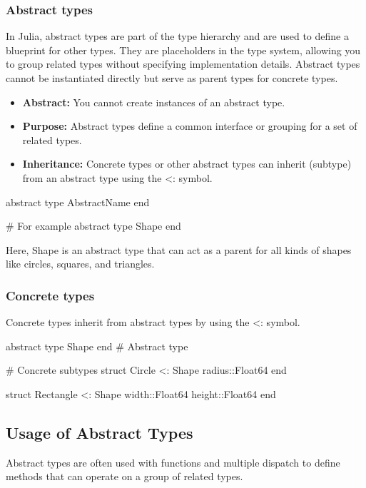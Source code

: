 \documentclass{report}
\begin{document}
     \subsubsection{Abstract types}
     \bigbreak \noindent 
     In Julia, abstract types are part of the type hierarchy and are used to define a blueprint for other types. They are placeholders in the type system, allowing you to group related types without specifying implementation details. Abstract types cannot be instantiated directly but serve as parent types for concrete types.
     \begin{itemize}
         \item \textbf{Abstract:} You cannot create instances of an abstract type.
         \item \textbf{Purpose:} Abstract types define a common interface or grouping for a set of related types.
         \item \textbf{Inheritance:} Concrete types or other abstract types can inherit (subtype) from an abstract type using the <: symbol.
     \end{itemize}
     \bigbreak \noindent 
     \begin{jlcode}
     abstract type AbstractName end

     # For example
     abstract type Shape end
     \end{jlcode}
     \bigbreak \noindent 
     Here, Shape is an abstract type that can act as a parent for all kinds of shapes like circles, squares, and triangles.

     \bigbreak \noindent 
     \subsubsection{Concrete types}
     \bigbreak \noindent 
     Concrete types inherit from abstract types by using the <: symbol.
     \bigbreak \noindent 
     \begin{jlcode}
         abstract type Shape end  # Abstract type

         # Concrete subtypes
         struct Circle <: Shape
             radius::Float64
         end

         struct Rectangle <: Shape
             width::Float64
             height::Float64
         end
     \end{jlcode}

     \bigbreak \noindent 
     \subsection{Usage of Abstract Types}
     \bigbreak \noindent 
     Abstract types are often used with functions and multiple dispatch to define methods that can operate on a group of related types.
\end{document}
